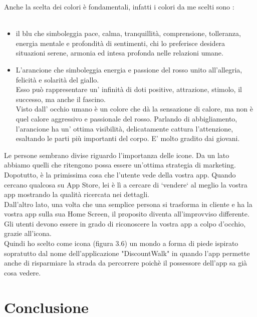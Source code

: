 Anche la scelta dei colori è fondamentali, infatti i colori da me scelti sono :\\\\
\begin{itemize}
\item il blu che simboleggia pace, calma, tranquillità, comprensione, tolleranza, energia mentale e profondità di sentimenti, chi lo preferisce desidera situazioni serene, armonia ed intesa profonda nelle relazioni umane.\\
\item L'arancione che simboleggia energia e passione del rosso unito all'allegria, felicità e solarità del giallo.\\ 
Esso può rappresentare un' infinità di doti positive, attrazione, stimolo, il successo, ma anche il fascino.\\ 
Visto dall' occhio umano è un colore che dà la sensazione di calore, ma non è quel calore aggressivo e passionale del rosso. Parlando di abbigliamento, l'arancione ha un' ottima visibilità, delicatamente cattura l'attenzione, esaltando le parti più importanti del corpo. E' molto gradito dai giovani.\\
\end{itemize}

Le persone sembrano divise riguardo l’importanza delle icone. Da un lato abbiamo quelli che ritengono possa essere un’ottima strategia di marketing. Dopotutto, è la primissima cosa che l’utente vede della vostra app. Quando cercano qualcosa su App Store, lei è lì a cercare di ‘vendere‘ al meglio la vostra app mostrando la qualità ricercata nei dettagli.\\

Dall’altro lato, una volta che una semplice persona si trasforma in cliente e ha la vostra app sulla sua Home Screen, il proposito diventa all’improvviso differente. Gli utenti devono essere in grado di riconoscere la vostra app a colpo d’occhio, grazie all’icona.\\

Quindi ho scelto come icona (figura 3.6) un mondo a forma di piede ispirato sopratutto dal nome dell'applicazione "DiscountWalk" in quando l'app permette anche di risparmiare la strada da percorrere poichè il possessore dell'app sa già cosa vedere.\\

\chapter*{Conclusione}
\vspace{2em}

